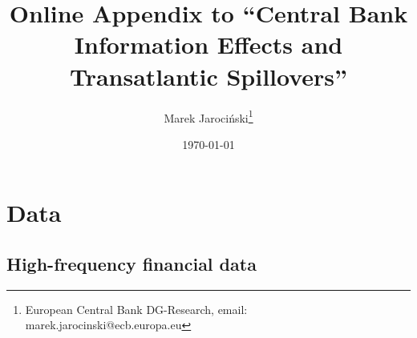 \documentclass[a4paper,12pt]{article}
\newcommand{\pathTables}{tables/}
\begin{document}

\author{Marek Jaroci\'nski\thanks{%
European Central Bank DG-Research, email: marek.jarocinski@ecb.europa.eu}}
\title{Online Appendix to ``Central Bank Information Effects and Transatlantic Spillovers''}
\date{\today}
\maketitle

\appendix

\renewcommand{\thesection}{Appendix \Alph{section}}
\renewcommand{\thesubsection}{\Alph{section}.\arabic{subsection}}
\renewcommand{\theequation}{\Alph{section}.\arabic{equation}}
\renewcommand{\thefigure}{\Alph{section}.\arabic{figure}}
\renewcommand{\thetable}{\Alph{section}.\arabic{table}}

\renewcommand{\pathTables}{../workm_lp/}

\section{Data}


\subsection{High-frequency financial data}
\end{document}
